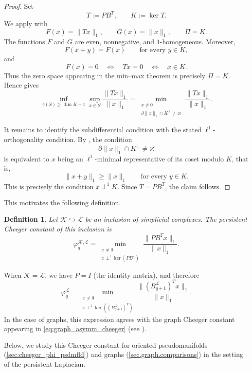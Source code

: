 \documentclass{article}
\newtheorem{definition}{Definition}[section]
\newcommand{\KK}{\mathcal{K}}
\newcommand{\LL}{\mathcal{L}}
\begin{document}
\begin{proof}
Set
\[
T:=PB^T,
\qquad
K:=\ker T.
\]
We apply \cite[Theorem 2.1]{jost2021discrete} with
\[
F(x)=\|Tx\|_1,
\qquad
G(x)=\|x\|_1,
\qquad
\Pi=K.
\]
The functions \(F\) and \(G\) are even, nonnegative, and \(1\)-homogeneous.
Moreover,
\[
F(x+y)=F(x)
\qquad
\text{for every } y\in K,
\]
and
\[
F(x)=0
\quad\Longleftrightarrow\quad
Tx=0
\quad\Longleftrightarrow\quad
x\in K.
\]
Thus the zero space appearing in the min--max theorem is precisely
\(\Pi=K\). Hence \cite[Theorem 2.1]{jost2021discrete} gives
\[
\inf_{\gamma(S)\geq \dim K+1}
\sup_{x\in S}
\frac{\|Tx\|_1}{\|x\|_1}
=
\min_{\substack{x\neq 0\\
\partial\|x\|_1\cap K^\perp\neq\varnothing}}
\frac{\|Tx\|_1}{\|x\|_1}.
\]

It remains to identify the subdifferential condition with the stated
\(\ell^1\)-orthogonality condition. By
\cite[Proposition 2.3]{jost2021discrete}, the condition
\[
\partial\|x\|_1\cap K^\perp\neq\varnothing
\]
is equivalent to \(x\) being an \(\ell^1\)-minimal representative of its
coset modulo \(K\), that is,
\[
\|x+y\|_1\geq \|x\|_1
\qquad
\text{for every } y\in K.
\]
This is precisely the condition \(x\perp^1 K\). Since \(T=PB^T\), the claim
follows.
\end{proof}

This motivates the following definition.

\begin{definition}\label{def:nonzero_cheeger}
Let \(\KK\hookrightarrow \LL\) be an inclusion of simplicial complexes. The
persistent Cheeger constant of this inclusion is
\[
\varphi_q^{\KK,\LL}
=
\min_{\substack{x\neq 0\\ x\perp^1\ker(PB^T)}}
\frac{\|PB^T x\|_1}{\|x\|_1}.
\]
\end{definition}

When \(\KK=\LL\), we have \(P=I\) (the identity matrix), and therefore
\begin{equation}\label{eq:non_zero_cheeger}
\varphi_q^{\LL}
=
\min_{\substack{x\neq 0\\
x\perp^1\ker\left((B_{q+1}^{\LL})^T\right)}}
\frac{\|(B_{q+1}^{\LL})^T x\|_1}{\|x\|_1}.
\end{equation}
In the case of graphs, this expression agrees with the graph Cheeger constant
appearing in \cref{eq:graph_asymm_cheeger}
(see {\cite[Theorem 2.12.]{MR1421568}}).

Below, we study this Cheeger constant for oriented pseudomanifolds
(\cref{sec:cheeger_phi_psdmfld}) and graphs
(\cref{sec.graph.comparisons}) in the setting of the persistent Laplacian.
\end{document}
